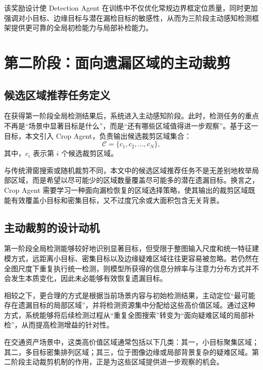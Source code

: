 该奖励设计使 Detection Agent 在训练中不仅优化常规边界框定位质量，同时更加强调对小目标、边缘目标与潜在漏检目标的敏感性，从而为三阶段主动感知检测框架提供更可靠的全局初检能力与局部补检能力。


\section{第二阶段：面向遗漏区域的主动裁剪}
\label{sec:stage2_active_crop}

\subsection{候选区域推荐任务定义}
\label{subsec:crop_task_definition}

在获得第一阶段全局检测结果后，系统进入主动感知阶段。此时，检测任务的重点不再是“场景中显著目标是什么”，而是“还有哪些区域值得进一步观察”。基于这一目标，本文引入 Crop Agent，负责输出候选裁剪区域集合：
\begin{equation}
\mathcal{C} = \{c_1, c_2, \dots, c_N\},
\label{eq:crop_regions_set}
\end{equation}
其中，$c_i$ 表示第 $i$ 个候选裁剪区域。

与传统滑窗搜索或随机裁剪不同，本文中的候选区域推荐任务不是无差别地枚举局部区域，而是希望以尽可能少的区域数量覆盖尽可能多的潜在遗漏目标。换言之，Crop Agent 需要学习一种面向漏检恢复的区域选择策略，使其输出的裁剪区域既能有效覆盖小目标和密集目标，又不过度冗余或大面积包含无关背景。

\subsection{主动裁剪的设计动机}
\label{subsec:motivation_of_active_crop}

第一阶段全局检测能够较好地识别显著目标，但受限于整图输入尺度和统一特征建模方式，远距离小目标、密集目标以及边缘疑难区域往往更容易被忽略。若仍然在全图尺度下重复执行统一检测，则模型所获得的信息分辨率与注意力分布方式并不会发生本质变化，因此未必能够有效恢复遗漏目标。

相较之下，更合理的方式是根据当前场景内容与初始检测结果，主动定位“最可能存在遗漏目标的局部区域”，并将检测资源集中分配给这些高价值区域。通过这种方式，系统能够将后续检测过程从“重复全图搜索”转变为“面向疑难区域的局部补检”，从而提高检测增益的针对性。

在交通资产场景中，这类高价值区域通常包括以下几类：其一，小目标聚集区域；其二，多目标密集排列区域；其三，位于图像边缘或局部背景复杂的疑难区域。第二阶段主动裁剪机制的作用，正是为这些区域提供进一步观察的机会。

